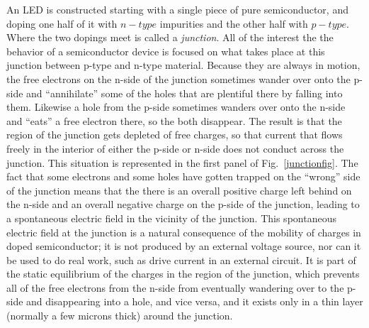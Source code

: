 \documentclass{revtex4}
\begin{document}
An LED is constructed starting with a single piece of pure semiconductor,
and doping one half of it with $n-type$ impurities and the other half with
$p-type$.  Where the two dopings meet is called a {\em junction}.  All of
the interest the the behavior of a semiconductor device is focused on what
takes place at this junction between p-type and n-type material. Because
they are always in motion, the free electrons on the n-side of the junction
sometimes wander over onto the p-side and ``annihilate'' some of the holes
that are plentiful there by falling into them.  Likewise a hole from the
p-side sometimes wanders over onto the n-side and ``eats'' a free electron
there, so the both disappear.  The result is that the region of the junction
gets depleted of free charges, so that current that flows freely in the
interior of either the p-side or n-side does not conduct across the junction.
This situation is represented in the first panel of Fig.~\ref{junctionfig}.
The fact that some electrons and some holes have gotten trapped on the
``wrong'' side of the junction means that the there is an overall positive
charge left behind on the n-side and an overall negative charge on the p-side
of the junction, leading to a spontaneous electric field in the vicinity of
the junction.  This spontaneous electric field at the junction is a natural
consequence of the mobility of charges in doped semiconductor; it is not
produced by an external voltage source, nor can it be used to do real work,
such as drive current in an external circuit.  It is part of the static
equilibrium of the charges in the region of the junction, which prevents
all of the free electrons from the n-side from eventually wandering over
to the p-side and disappearing into a hole, and vice versa, and it exists
only in a thin layer (normally a few microns thick) around the junction.
\end{document}
